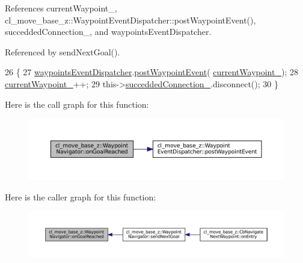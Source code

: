 References current\+Waypoint\+\_\+, cl\+\_\+move\+\_\+base\+\_\+z\+::\+Waypoint\+Event\+Dispatcher\+::post\+Waypoint\+Event(), succedded\+Connection\+\_\+, and waypoints\+Event\+Dispatcher.



Referenced by send\+Next\+Goal().


\begin{DoxyCode}
26 \{
27   \hyperlink{classcl__move__base__z_1_1WaypointNavigator_a4f2be7a9741e8535c414e63335d752a0}{waypointsEventDispatcher}.\hyperlink{classcl__move__base__z_1_1WaypointEventDispatcher_a6462eae610b97df2207ecd93c1544aaf}{postWaypointEvent}(
      \hyperlink{classcl__move__base__z_1_1WaypointNavigator_a82859e418592c2392c20a2d11b9836eb}{currentWaypoint\_});
28   \hyperlink{classcl__move__base__z_1_1WaypointNavigator_a82859e418592c2392c20a2d11b9836eb}{currentWaypoint\_}++;
29   this->\hyperlink{classcl__move__base__z_1_1WaypointNavigator_a6e32b1d6cae56963187d0965de251108}{succeddedConnection\_}.disconnect();
30 \}
\end{DoxyCode}
Here is the call graph for this function\+:
\nopagebreak
\begin{figure}[H]
\begin{center}
\leavevmode
\includegraphics[width=350pt]{classcl__move__base__z_1_1WaypointNavigator_ae10ba80b7e46b62096cac96609f66893_cgraph}
\end{center}
\end{figure}
Here is the caller graph for this function\+:
\nopagebreak
\begin{figure}[H]
\begin{center}
\leavevmode
\includegraphics[width=350pt]{classcl__move__base__z_1_1WaypointNavigator_ae10ba80b7e46b62096cac96609f66893_icgraph}
\end{center}
\end{figure}
\mbox{\label{classcl__move__base__z_1_1WaypointNavigator_ac60ecf63f7a2a84f3ef51f04cc222a70}} 
